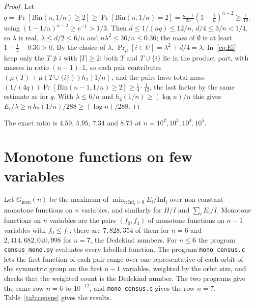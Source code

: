 \documentclass[11pt]{amsart}
\theoremstyle{remark}
\newcommand{\Inf}{\mathrm{Inf}}
\begin{document}
\begin{proof}
Let $q=\Pr[\mathrm{Bin}(n,1/n)\ge2]\ge\Pr[\mathrm{Bin}(n,1/n)=2]=\frac{n-1}{2n}(1-\frac1n)^{n-2}\ge\frac1{12}$, using
$(1-1/n)^{n-2}\ge e^{-1}>1/3$. Then $d\le1/(nq)\le12/n$, $d/4\le3/n<1/4$, so $\lambda$ is real, $\lambda\le d/2\le6/n$ and
$n\lambda^2\le36/n\le0.36$; the mass of $\emptyset$ is at least $1-\frac14-0.36>0$. By the choice of $\lambda$,
$\Pr_\mu[i\in U]=\lambda^2+d/4=\lambda$. In~\eqref{eq:Ei} keep only the $T\not\ni i$ with $|T|\ge2$: both $T$ and
$T\cup\{i\}$ lie in the product part, with masses in ratio $(n-1):1$, so each pair contributes
$(\mu(T)+\mu(T\cup\{i\}))h_2(1/n)$, and the pairs have total mass $(1/(4q))\Pr[\mathrm{Bin}(n-1,1/n)\ge2]\ge\frac14\cdot\frac1{12}$,
the last factor by the same estimate as for $q$. With $\lambda\le6/n$ and $h_2(1/n)\ge(\log n)/n$ this gives
$E_i/\lambda\ge n\,h_2(1/n)/288\ge(\log n)/288$.
\end{proof}

The exact ratio is $4.59$, $5.95$, $7.34$ and $8.73$ at $n=10^2,10^3,10^4,10^5$.

\section{Monotone functions on few variables}\label{sec:census}

Let $G_{\mathrm{mon}}(n)$ be the maximum of $\min_{i:\Inf_i>0}E_i/\Inf_i$ over non-constant monotone functions on $n$
variables, and similarly for $H/I$ and $\sum_iE_i/I$. Monotone functions on $n$ variables are the pairs $(f_0,f_1)$ of
monotone functions on $n-1$ variables with $f_0\le f_1$; there are $7{,}828{,}354$ of them for $n=6$ and
$2{,}414{,}682{,}040{,}998$ for $n=7$, the Dedekind numbers. For $n\le6$ the program \texttt{census\_mono.py}
evaluates every labelled function. The program \texttt{mono\_census.c} lets the first function of each pair range over
one representative of each orbit of the symmetric group on the first $n-1$ variables, weighted by the orbit size, and
checks that the weighted count is the Dedekind number. The two programs give the same row $n=6$ to $10^{-12}$, and
\texttt{mono\_census.c} gives the row $n=7$.
Table~\ref{tab:census} gives the results.
\end{document}
